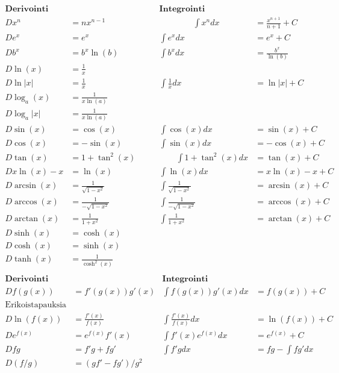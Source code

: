 \documentclass[12pt]{article}
\begin{document}
$$
\begin{array}{rl|rl}
\textbf{Derivointi} && \textbf{Integrointi}&\\[2mm]
Dx^n&=nx^{n-1}     \qquad\qquad&\qquad\qquad\int x^ndx&=\frac{x^{n+1}}{n+1}+C \\[2mm]
De^x&=e^x &\int e^xdx&=e^x+C\\[2mm]
Db^x&=b^x\ln(b) & \int b^xdx&=\frac{b^x}{\ln(b)}\\[2mm]
D\ln(x)&=\frac{1}{x} &&\\[2mm]
D\ln|x|&=\frac{1}{x} &\int\frac{1}{x}dx&=\ln|x|+C\\[2mm]
D\log_a(x)&=\frac{1}{x\ln(a)} &&\\[2mm]
D\log_a|x|&=\frac{1}{x\ln(a)} &&\\[2mm]
D\sin(x)&=\cos(x)   &\int\cos(x)dx&=\sin(x)+C\\[2mm]
D\cos(x)&=-\sin(x)  &\int\sin(x)dx&=-\cos(x)+C\\[2mm]
D\tan(x)&=1+\tan^2(x) \qquad&\qquad\int 1+\tan^2(x)dx&=\tan(x)+C\\[2mm]

Dx\ln(x)-x&=\ln(x) & \int\ln(x)dx&=x\ln(x)-x+C\\[10mm]

D\arcsin(x)&=\frac{1}{\sqrt{1-x^2}} & \int\frac{1}{\sqrt{1-x^2}}&=\arcsin(x)+C\\
D\arccos(x)&=\frac{1}{-\sqrt{1-x^2}} & \int\frac{1}{-\sqrt{1-x^2}}&=\arccos(x)+C\\
D\arctan(x)&=\frac{1}{1+x^2} & \int\frac{1}{1+x^2}&=\arctan(x)+C\\

D\sinh(x)&=\cosh(x) &&\\
D\cosh(x)&=\sinh(x) &&\\
D\tanh(x)&=\frac{1}{\cosh^2(x)} &&\\
\end{array}  
$$
\vspace{1cm}
$$
\begin{array}{rl|rl}
\textbf{Derivointi} && \textbf{Integrointi}&\\[2mm]
D f(g(x))&=f'(g(x))g'(x) & \int f(g(x))g'(x)dx&=f(g(x))+C\\[2mm]
\textrm{Erikoistapauksia} &&&\\
D\ln(f(x))&=\frac{f'(x)}{f(x)} & \int \frac{f'(x)}{f(x)}dx&=\ln(f(x))+C\\[2mm]
D e^{f(x)}&=e^{f(x)}f'(x) & \int f'(x)e^{f(x)}dx&=e^{f(x)}+C\\[10mm]
D fg&=f'g+fg'& \int f'g dx&=fg-\int fg'dx\\[2mm]
D (f/g)&=(gf'-fg')/g^2 &&\\[2mm]
\end{array}  
$$
\end{document}
